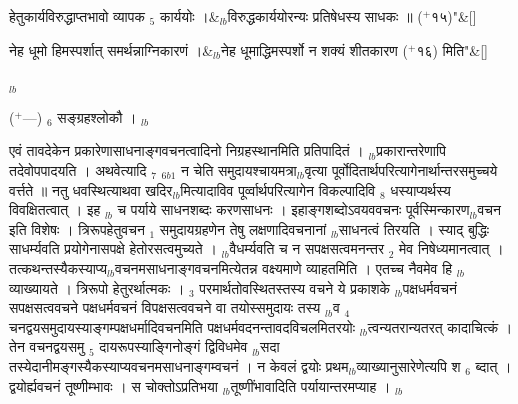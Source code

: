 \documentclass[article,12pt,a4paper]{memoir}%
\newcommand{\add}[1]{($^{+}$#1)}
\newcounter{parCount}
\begin{document}
	    
	    \stanza[\smallbreak]
	  हेतुकार्यविरुद्धाप्तभावो व्यापक {\tiny $_{5}$} कार्ययोः ।&{\tiny $_{lb}$}विरुद्धकार्ययोरन्यः प्रतिषेधस्य साधकः ॥ \add{१५}{\normalfontlatin\large\qquad{}"}\&[\smallbreak]
	  
	  
	  
	  \endgroup
	
	  \bigskip
	  \begingroup
	
	    
	    \stanza[\smallbreak]
	  नेह धूमो हिमस्पर्शात् समर्थन्नाग्निकारणं ।&{\tiny $_{lb}$}नेह धूमाद्धिमस्पर्शो न शक्यं शीतकारण \add{१६} मिति{\normalfontlatin\large\qquad{}"}\&[\smallbreak]
	  
	  
	  
	  \endgroup
	{\tiny $_{lb}$}

	  
	  \pstart \leavevmode%
	\add{—} {\tiny $_{6}$} सङ्ग्रहश्लोकौ ।
	{}
	\pend%
      {\tiny $_{lb}$}

	  
	  \pstart \leavevmode%
	एवं तावदेकेन प्रकारेणासाधनाङ्गवचनत्वादिनो निग्रहस्थानमिति प्रतिपादितं । {\tiny $_{lb}$}प्रकारान्तरेणापि तदेवोपपादयति । {\color{DodgerBlue3}अथवेत्यादि {\tiny $_{7}$}} {\tiny $_{6b1}$} न चेति समुदायश्चायमत्रा{\tiny $_{lb}$}वृत्या पूर्वोदितार्थपरित्यागेनार्थान्तरसमुच्चये वर्त्तते ॥ नतु धवस्थित्याथवा खदिर{\tiny $_{lb}$}मित्यादाविव पूर्व्वार्थपरित्यागेन विकल्पादिवि {\tiny $_{8}$} \leavevmode{} धस्याप्यर्थस्य विवक्षितत्वात् । इह {\tiny $_{lb}$} \leavevmode{} च पर्याये साधनशब्दः करणसाधनः । इहाङ्गशब्दोऽवयववचनः पूर्वस्मिन्कारण{\tiny $_{lb}$}वचन इति विशेषः । त्रिरूपहेतुवचन {\tiny $_{1}$} समुदायग्रहणेन तेषु लक्षणादिवचनानां {\tiny $_{lb}$}साधनत्वं तिरयति । स्याद् बुद्धिः साधर्म्यवति प्रयोगेनासपक्षे हेतोरसत्वमुच्यते । {\tiny $_{lb}$}वैधर्म्यवति च न सपक्षसत्वमनन्तर {\tiny $_{2}$} मेव निषेध्यमानत्वात् । तत्कथन्तस्यैकस्याप्य{\tiny $_{lb}$}वचनमसाधनाङ्गवचनमित्येतन्न वक्ष्यमाणे व्याहतमिति । एतच्च नैवमेव हि {\tiny $_{lb}$}व्याख्यायते । त्रिरूपो हेतुरर्थात्मकः । {\tiny $_{3}$} परमार्थतोवस्थितस्तस्य वचने ये प्रकाशके {\tiny $_{lb}$}पक्षधर्मवचनं सपक्षसत्ववचने पक्षधर्मवचनं विपक्षसत्ववचने वा तयोस्समुदायः तस्य {\tiny $_{lb}$}व {\tiny $_{4}$} चनद्वयसमुदायस्याङ्गम्पक्षधर्मादिवचनमिति पक्षधर्मवदनन्तावदविचलमितरयोः {\tiny $_{lb}$}त्वन्यतरान्यतरत् कादाचित्कं । तेन वचनद्वयसमु {\tiny $_{5}$} दायरूपस्याङ्गिनोङ्गं द्विविधमेव {\tiny $_{lb}$}सदा तस्येदानीमङ्गस्यैकस्याप्यवचनमसाधनाङ्गम्वचनं । न केवलं द्वयोः प्रथम{\tiny $_{lb}$}व्याख्यानुसारेणेत्यपि श {\tiny $_{6}$} ब्दात् । द्वयोर्ह्यवचनं तूष्णीम्भावः । स चोक्तोऽप्रतिभया {\tiny $_{lb}$}तूष्णींभावादिति पर्यायान्तरमप्याह ।
	{}
	\pend%
      {\tiny $_{lb}$}
\end{document}
